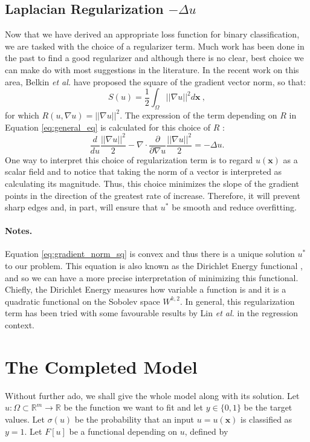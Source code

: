 \documentclass{INGUADY}
\begin{document}
\subsection{Laplacian Regularization $- \Delta u$} 
Now that we have derived an appropriate loss function for binary classification, we are tasked with the choice of a regularizer term. Much work has been done in the past to find a good regularizer and although there is no clear, best choice we can make do with most suggestions in the literature. In the recent work on this area, Belkin \textit{et al.} have proposed the square of the gradient vector norm, so that:
\begin{equation} \label{eq:gradient_norm_sq}
S(u) = \dfrac{1}{2} \int_\Omega || \nabla u ||^2 d\mathbf{x} \ ,
\end{equation}
for which $R(u, \nabla u) = || \nabla u ||^2$. The expression of the term depending on $R$ in Equation \ref{eq:general_eq} is calculated for this choice of $R$
:\begin{equation} \label{eq:laplacion_reg}
\dfrac{d}{du} \dfrac{||\nabla u||^2}{2}  - \nabla \cdot  \dfrac{\partial}{\partial \nabla u}  \dfrac{||\nabla u||^2}{2} = - \Delta u.
\end{equation}
One way to interpret this choice of regularization term is to regard $u(\mathbf{x})$ as a scalar field and to notice that taking the norm of a vector is interpreted as calculating its magnitude. Thus, this choice minimizes the slope of the gradient points in the direction of the greatest rate of increase. Therefore, it will prevent sharp edges and, in part, will ensure that $u^*$ be smooth and reduce overfitting.
\paragraph{Notes.}
Equation \ref{eq:gradient_norm_sq} is convex and thus there is a unique solution $u^*$ to our problem.
This equation is also known as the Dirichlet Energy functional \cite{evans}, and so we can have a more precise interpretation of minimizing this functional. Chiefly, the Dirichlet Energy measures how variable a function is and it is a quadratic functional on the Sobolev space $W^{k,2}$. In general, this regularization term has been tried with some favourable results by Lin \textit{et al.} \cite{tonglin} in the regression context.

\section{The Completed Model}
Without further ado, we shall give the whole model along with its solution. Let $u: \Omega \subset \mathbb{R}^m \rightarrow \mathbb{R}$ be the function we want to fit and let $y \in \{ 0, 1\}$ be the target values. Let $\sigma(u)$ be the probability that an input $u = u(\mathbf{x})$ is classified as $y = 1$. Let $F[u]$ be a functional depending on $u$, defined by
\end{document}
